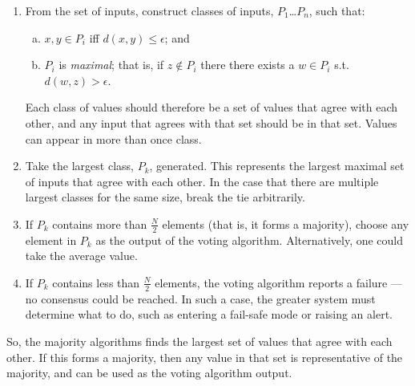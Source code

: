 \begin{enumerate}

 \item From the set of inputs, construct classes of inputs, \(P_1\)\ldots\(P_n\), such that:

\begin{enumerate}[(a)]

\item \(x,y\in P_i\) iff \(d(x,y)\leq\epsilon\); and

\item \(P_i\) is \emph{maximal}; that is, if \(z\not\in P_i\) there there
exists a \(w\in P_i\) s.t. \(d(w,z) > \epsilon\).

\end{enumerate}

 Each class of values should therefore be a set of values that agree with each other, and any input that agrees with that set should be in that set. Values can appear in more than once class.

 \item Take the largest class, \(P_k\), generated. This represents the largest maximal set of inputs that agree with each other. In the case that there are multiple largest classes for the same size, break the tie arbitrarily.

 \item If \(P_k\)  contains more than \(\frac{N}{2}\) elements (that is, it forms a majority), choose any element in \(P_k\) as the output of the voting algorithm. Alternatively, one could take the average value.

 \item If \(P_k\) contains less than \(\frac{N}{2}\)  elements, the voting algorithm reports a failure --- no consensus could be reached. In such a case, the greater system must determine what to do, such as entering a fail-safe mode or raising an alert.

\end{enumerate}

So, the majority algorithms finds the largest set of values that agree with each other. If this forms a majority, then any value in that set is representative of the majority, and can be used as the voting algorithm output.

